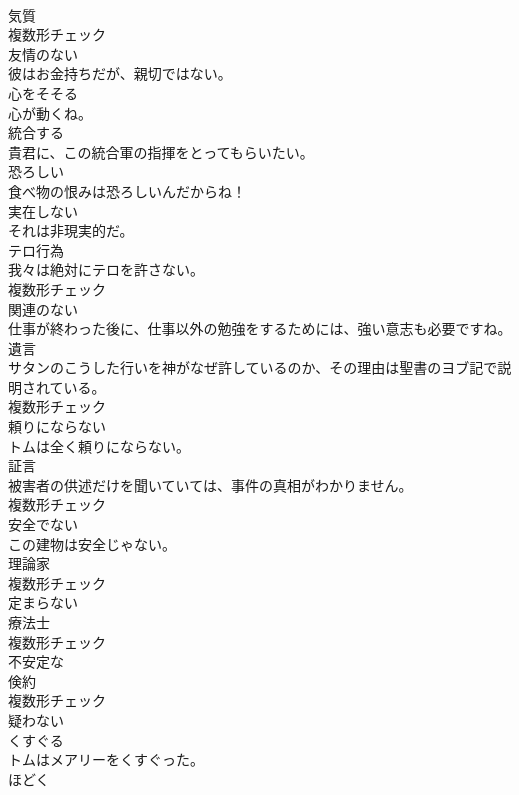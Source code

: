 \documentclass[8pt]{extreport}
\begin{document}
\begin{CJK}{UTF8}{min}
\\	[名詞]	気質	
\\	複数形チェック
\\	[形容詞]	友情のない	
\\	彼はお金持ちだが、親切ではない。	
\\	[形容詞]	心をそそる	
\\	心が動くね。	
\\	[動詞]	統合する	
\\	貴君に、この統合軍の指揮をとってもらいたい。	
\\	[形容詞]	恐ろしい	
\\	食べ物の恨みは恐ろしいんだからね！	
\\	[形容詞]	実在しない	
\\	それは非現実的だ。	
\\	[名詞]	テロ行為	
\\	我々は絶対にテロを許さない。	
\\	複数形チェック
\\	[形容詞]	関連のない	
\\	仕事が終わった後に、仕事以外の勉強をするためには、強い意志も必要ですね。	
\\	[名詞]	遺言	
\\	サタンのこうした行いを神がなぜ許しているのか、その理由は聖書のヨブ記で説明されている。	
\\	複数形チェック
\\	[形容詞]	頼りにならない	
\\	トムは全く頼りにならない。	
\\	[名詞]	証言	
\\	被害者の供述だけを聞いていては、事件の真相がわかりません。	
\\	複数形チェック
\\	[形容詞]	安全でない	
\\	この建物は安全じゃない。	
\\	[名詞]	理論家	
\\	複数形チェック
\\	[形容詞]	定まらない	
\\	[名詞]	療法士	
\\	複数形チェック
\\	[形容詞]	不安定な	
\\	[名詞]	倹約	
\\	複数形チェック
\\	[形容詞]	疑わない	
\\	[動詞]	くすぐる	
\\	トムはメアリーをくすぐった。	
\\	[動詞]	ほどく	

\end{CJK}
\end{document}
